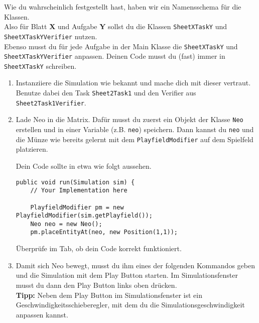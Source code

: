 


\begin{Infobox}
    Wie du wahrscheinlich festgestellt hast, haben wir ein Namensschema für die Klassen.\\
    Also für Blatt \textbf{X} und Aufgabe \textbf{Y} sollst du die Klassen \lstinline{SheetXTaskY} und \lstinline{SheetXTaskYVerifier} nutzen.\\
    Ebenso musst du für jede Aufgabe in der Main Klasse die \lstinline{SheetXTaskY} und \lstinline{SheetXTaskYVerifier} anpassen.
    Deinen Code musst du (fast) immer in \lstinline{SheetXTaskY} schreiben.
\end{Infobox}

\begin{enumerate}
    \item Instanziiere die Simulation wie bekannt und mache dich mit dieser vertraut. 
        Benutze dabei den Task \lstinline{Sheet2Task1} und den Verifier aus \lstinline{Sheet2Task1Verifier}.
    \item Lade Neo in die Matrix.
        Dafür musst du zuerst ein Objekt der Klasse \lstinline{Neo} erstellen und in einer Variable (z.B. \lstinline{neo}) speichern.
        Dann kannst du \lstinline{neo} und die Münze wie bereits gelernt mit dem \lstinline{PlayfieldModifier} auf dem Spielfeld platzieren.

        Dein Code sollte in etwa wie folgt aussehen.

        \begin{lstlisting}[firstnumber=14]
public void run(Simulation sim) {
    // Your Implementation here

    PlayfieldModifier pm = new PlayfieldModifier(sim.getPlayfield());
    Neo neo = new Neo();
    pm.placeEntityAt(neo, new Position(1,1));
        \end{lstlisting}

        Überprüfe im  Tab, ob dein Code korrekt funktioniert.
        \item Damit sich Neo bewegt, musst du ihm eines der folgenden Kommandos geben und die Simulation mit dem Play Button starten. Im Simulationsfenster musst du dann den Play Button links oben drücken. \\
        \textbf{Tipp:} Neben dem Play Button im Simulationsfenster ist ein Geschwindigkeitsschieberegler, mit dem du die Simulationsgeschwindigkeit anpassen kannst.


\end{enumerate}
